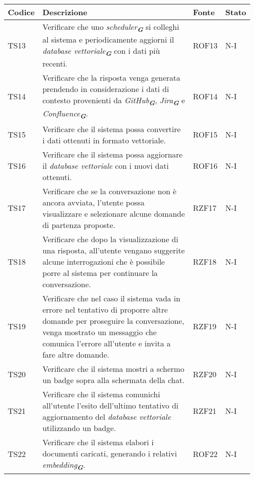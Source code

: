 \begin{table}[h!]
    \centering
    \renewcommand{\arraystretch}{1.5}
    \begin{tabularx}{\textwidth}{|p{}|X|p{}|p{}|}\hline
    \rowcolor[HTML]{FFD700}
    \textbf{Codice} & \textbf{Descrizione} & \textbf{Fonte} & \textbf{Stato} \\ \hline
    TS13 & Verificare che uno \emph{scheduler}\textsubscript{\textit{\textbf{G}}} si colleghi al sistema e periodicamente aggiorni il \emph{database vettoriale}\textsubscript{\textit{\textbf{G}}} con i dati più recenti. & ROF13 & N-I \\ \hline
    TS14 & Verificare che la risposta venga generata prendendo in considerazione i dati di contesto provenienti da \emph{GitHub}\textsubscript{\textit{\textbf{G}}}, \emph{Jira}\textsubscript{\textit{\textbf{G}}} e \emph{Confluence}\textsubscript{\textit{\textbf{G}}}. & ROF14 & N-I \\ \hline
    TS15 & Verificare che il sistema possa convertire i dati ottenuti in formato vettoriale. & ROF15 & N-I \\ \hline
    TS16 & Verificare che il sistema possa aggiornare il \emph{database vettoriale} con i nuovi dati ottenuti. & ROF16 & N-I \\ \hline
    TS17 & Verificare che se la conversazione non è ancora avviata, l'utente possa visualizzare e selezionare alcune domande di partenza proposte. & RZF17 & N-I \\ \hline
    TS18 & Verificare che dopo la visualizzazione di una risposta, all'utente vengano suggerite alcune interrogazioni che è possibile porre al sistema per continuare la conversazione. & RZF18 & N-I \\ \hline
    TS19 & Verificare che nel caso il sistema vada in errore nel tentativo di proporre altre domande per proseguire la conversazione, venga mostrato un messaggio che comunica l'errore all'utente e invita a fare altre domande. & RZF19 & N-I \\ \hline
    TS20 & Verificare che il sistema mostri a schermo un badge sopra alla schermata della chat. & RZF20 & N-I \\ \hline
    TS21 & Verificare che il sistema comunichi all’utente l’esito dell’ultimo tentativo di aggiornamento del \emph{database vettoriale} utilizzando un badge. & RZF21 & N-I \\ \hline
    TS22 & Verificare che il sistema elabori i documenti caricati, generando i relativi \emph{embedding}\textsubscript{\textit{\textbf{G}}}. & ROF22 & N-I \\ \hline

\end{tabularx}
\end{table}
